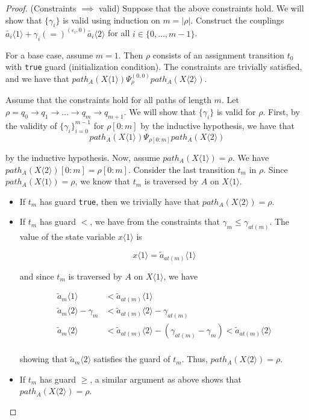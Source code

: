 \documentclass{article}
\renewcommand{\epsilon}{\varepsilon}
\newcommand{\1}{\langle 1 \rangle}
\newcommand{\2}{\langle 2 \rangle}
\begin{document}
\begin{proof}
    (Constraints $\implies$ valid) Suppose that the above constraints hold. We will show that $\{\gamma_i\}$ is valid using induction on $m = |\rho|$. Construct the couplings $\tilde{a_i} \1 + \gamma_i (=)^{(\epsilon_i, 0)} \tilde{a_i} \2$ for all $i \in \{0, \dots, m - 1\}$. 

    For a base case, assume $m = 1$. Then $\rho$ consists of an assignment transition $t_0$ with \texttt{true} guard (initialization condition). The constraints are trivially satisfied, and we have that $path_A(X \1 ) \Psi_\rho^{(0, 0)} path_A(X \2)$.

    Assume that the constraints hold for all paths of length $m$. Let $\rho = q_0 \to q_1 \to \dots \to q_{m} \to q_{m + 1}$. We will show that $\{\gamma_i\}$ is valid for $\rho$. First, by the validity of $\{\gamma_i\}_{i = 0}^{m - 1}$ for $\rho[0:m]$ by the inductive hypothesis, we have that \[path_A(X \1) \Psi_{\rho[0:m]} path_A(X \2)\] 
    
    by the inductive hypothesis. Now, assume $path_A(X \1) = \rho$. We have $path_A(X \2)[0:m] = \rho[0:m]$. Consider the last transition $t_{m}$ in $\rho$. Since $path_A(X \1) = \rho$, we know that $t_m$ is traversed by $A$ on $X \1$.

    \begin{itemize}
        \item If $t_{m}$ has guard \texttt{true}, then we trivially have that $path_A(X \2) = \rho$.
        \item If $t_{m}$ has guard $<$, we have from the constraints that $\gamma_{m} \leq \gamma_{at(m)}$. The value of the state variable $x \langle 1 \rangle$ is 
        
        \[x \1 = \tilde{a}_{at(m)} \1 \]

        and since $t_m$ is traversed by $A$ on $X \1$, we have 

        \begin{align*}
            \tilde{a}_{m} \1 &< \tilde{a}_{at(m)} \1\\
            \tilde{a}_{m} \2 - \gamma_m &< \tilde{a}_{at(m)} \2 - \gamma_{at(m)}\\
            \tilde{a}_{m} \2 &< \tilde{a}_{at(m)} \2 - (\gamma_{at(m)} - \gamma_{m}) < \tilde{a}_{at(m)} \2\\
        \end{align*}

        showing that $\tilde{a}_{m} \2$ satisfies the guard of $t_m$. Thus, $path_A(X \2) = \rho$.
        \item If $t_{m}$ has guard $\geq$, a similar argument as above shows that $path_A(X \2) = \rho$.
    \end{itemize}


\end{proof}
\end{document}
